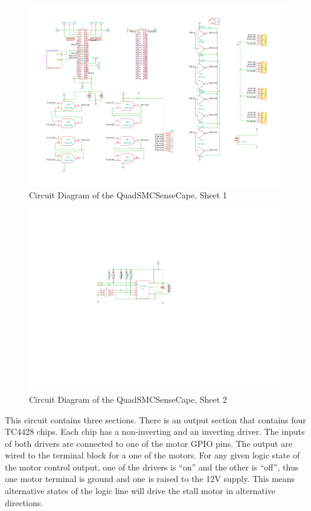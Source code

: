 \begin{figure}[hbpt]\begin{centering}%
\includegraphics[width=5in]{QuadSMCSenseCape-1.pdf}
\caption{Circuit Diagram of the QuadSMCSenseCape, Sheet 1}
\end{centering}\end{figure}
\begin{figure}[hbpt]\begin{centering}%
\includegraphics[width=5in]{QuadSMCSenseCape-2.pdf}
\caption{Circuit Diagram of the QuadSMCSenseCape, Sheet 2}
\end{centering}\end{figure}
This circuit contains three sections.  There is an output section that contains 
four TC4428 chips.  Each chip has a non-inverting and an inverting driver. The 
inputs of both drivers are connected to one of the motor GPIO pins.  The 
output are wired to the terminal block for a one of the motors. For any given 
logic state of the motor control output, one of the drivers is ``on'' and the 
other is ``off'', thus one motor terminal is ground and one is raised to the 
12V supply.  This means alternative states of the logic line will drive the 
stall motor in alternative directions.

